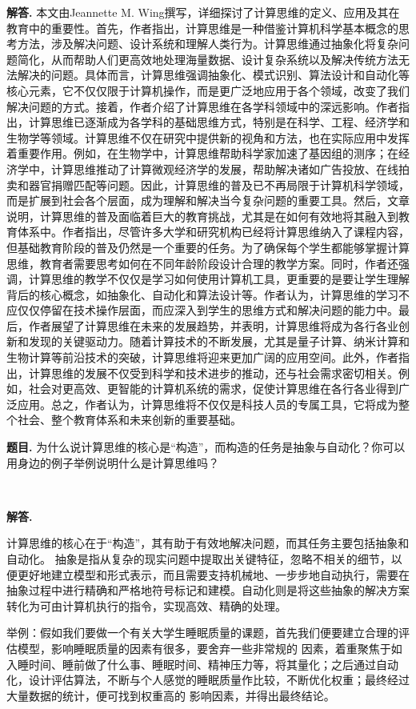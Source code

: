\documentclass[10pt, a4paper, oneside]{ctexart}
\newcounter{problemname}
\newenvironment{problem}{\stepcounter{problemname}\par\noindent\textbf{题目\arabic{problemname}. }}{\\\par}
\newenvironment{solution}{\par\noindent\textbf{解答. }}{\\\par}
\begin{document}
\begin{solution}
    本文由Jeannette M. Wing撰写，详细探讨了计算思维的定义、应用及其在教育中的重要性。首先，作者指出，计算思维是一种借鉴计算机科学基本概念的思考方法，涉及解决问题、设计系统和理解人类行为。计算思维通过抽象化将复杂问题简化，从而帮助人们更高效地处理海量数据、设计复杂系统以及解决传统方法无法解决的问题。具体而言，计算思维强调抽象化、模式识别、算法设计和自动化等核心元素，它不仅仅限于计算机操作，而是更广泛地应用于各个领域，改变了我们解决问题的方式。接着，作者介绍了计算思维在各学科领域中的深远影响。作者指出，计算思维已逐渐成为各学科的基础思维方式，特别是在科学、工程、经济学和生物学等领域。计算思维不仅在研究中提供新的视角和方法，也在实际应用中发挥着重要作用。例如，在生物学中，计算思维帮助科学家加速了基因组的测序；在经济学中，计算思维推动了计算微观经济学的发展，帮助解决诸如广告投放、在线拍卖和器官捐赠匹配等问题。因此，计算思维的普及已不再局限于计算机科学领域，而是扩展到社会各个层面，成为理解和解决当今复杂问题的重要工具。然后，文章说明，计算思维的普及面临着巨大的教育挑战，尤其是在如何有效地将其融入到教育体系中。作者指出，尽管许多大学和研究机构已经将计算思维纳入了课程内容，但基础教育阶段的普及仍然是一个重要的任务。为了确保每个学生都能够掌握计算思维，教育者需要思考如何在不同年龄阶段设计合理的教学方案。同时，作者还强调，计算思维的教学不仅仅是学习如何使用计算机工具，更重要的是要让学生理解背后的核心概念，如抽象化、自动化和算法设计等。作者认为，计算思维的学习不应仅仅停留在技术操作层面，而应深入到学生的思维方式和解决问题的能力中。最后，作者展望了计算思维在未来的发展趋势，并表明，计算思维将成为各行各业创新和发现的关键驱动力。随着计算技术的不断发展，尤其是量子计算、纳米计算和生物计算等前沿技术的突破，计算思维将迎来更加广阔的应用空间。此外，作者指出，计算思维的发展不仅受到科学和技术进步的推动，还与社会需求密切相关。例如，社会对更高效、更智能的计算机系统的需求，促使计算思维在各行各业得到广泛应用。总之，作者认为，计算思维将不仅仅是科技人员的专属工具，它将成为整个社会、整个教育体系和未来创新的重要基础。
\end{solution}

\begin{problem}
    为什么说计算思维的核心是“构造”，而构造的任务是抽象与自动化？你可以用身边的例子举例说明什么是计算思维吗？

\end{problem}

\begin{solution}
    
    计算思维的核心在于“构造”，其有助于有效地解决问题，而其任务主要包括抽象和自动化。
    抽象是指从复杂的现实问题中提取出关键特征，忽略不相关的细节，以便更好地建立模型和形式表示，而且需要支持机械地、一步步地自动执行，需要在抽象过程中进行精确和严格地符号标记和建模。自动化则是将这些抽象的解决方案转化为可由计算机执行的指令，实现高效、精确的处理。

    举例：假如我们要做一个有关大学生睡眠质量的课题，首先我们便要建立合理的评估模型，影响睡眠质量的因素有很多，要舍弃一些非常规的
    因素，着重聚焦于如入睡时间、睡前做了什么事、睡眠时间、精神压力等，将其量化；之后通过自动化，设计评估算法，不断与个人感觉的睡眠质量作比较，不断优化权重；最终经过大量数据的统计，便可找到权重高的
    影响因素，并得出最终结论。
\end{solution}
\end{document}
